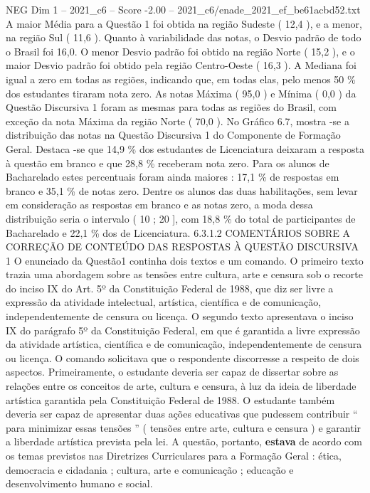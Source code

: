 \begin{textsample}{NEG Dim 1 – 2021\_c6 – Score -2.00 – 2021\_c6/enade\_2021\_ef\_be61acbd52.txt}
A maior Média para a Questão 1 foi obtida na região Sudeste ( 12,4 ), e a menor, na região Sul ( 11,6 ).
Quanto à variabilidade das notas, o Desvio padrão de todo o Brasil foi 16,0.
O menor Desvio padrão foi obtido na região Norte ( 15,2 ), e o maior Desvio padrão foi obtido pela região Centro-Oeste ( 16,3 ).
A Mediana foi igual a zero em todas as regiões, indicando que, em todas elas, pelo menos 50 \% dos estudantes tiraram nota zero.
As notas Máxima ( 95,0 ) e Mínima ( 0,0 ) da Questão Discursiva 1 foram as mesmas para todas as regiões do Brasil, com exceção da nota Máxima da região Norte ( 70,0 ).
No Gráfico 6.7, mostra -se a distribuição das notas na Questão Discursiva 1 do Componente de Formação Geral.
Destaca -se que 14,9 \% dos estudantes de Licenciatura deixaram a resposta à questão em branco e que 28,8 \% receberam nota zero.
Para os alunos de Bacharelado estes percentuais foram ainda maiores : 17,1 \% de respostas em branco e 35,1 \% de notas zero.
Dentre os alunos das duas habilitações, sem levar em consideração as respostas em branco e as notas zero, a moda dessa distribuição seria o intervalo ( 10 ; 20 ], com 18,8 \% do total de participantes de Bacharelado e 22,1 \% dos de Licenciatura. 6.3.1.2 COMENTÁRIOS SOBRE A CORREÇÃO DE CONTEÚDO DAS RESPOSTAS À QUESTÃO DISCURSIVA 1 O enunciado da Questão1 continha dois textos e um comando.
O primeiro texto trazia uma abordagem sobre as tensões entre cultura, arte e censura sob o recorte do inciso IX do Art. 5º da Constituição Federal de 1988, que diz ser livre a expressão da atividade intelectual, artística, científica e de comunicação, independentemente de censura ou licença.
O segundo texto apresentava o inciso IX do parágrafo 5º da Constituição Federal, em que é garantida a livre expressão da atividade artística, científica e de comunicação, independentemente de censura ou licença.
O comando solicitava que o respondente discorresse a respeito de dois aspectos.
Primeiramente, o estudante deveria ser capaz de dissertar sobre as relações entre os conceitos de arte, cultura e censura, à luz da ideia de liberdade artística garantida pela Constituição Federal de 1988.
O estudante também deveria ser capaz de apresentar duas ações educativas que pudessem contribuir “ para minimizar essas tensões ” ( tensões entre arte, cultura e censura ) e garantir a liberdade artística prevista pela lei.
A questão, portanto, \textbf{estava} de acordo com os temas previstos nas Diretrizes Curriculares para a Formação Geral : ética, democracia e cidadania ; cultura, arte e comunicação ; educação e desenvolvimento humano e social.

\end{textsample}
